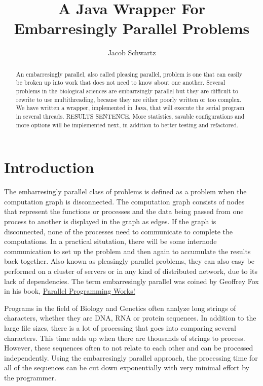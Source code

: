 \documentclass[12pt]{article}
\begin{document}
\title{A Java Wrapper For Embarresingly Parallel Problems}
\author{Jacob Schwartz}
\maketitle

\begin{abstract}
An embarresingly parallel, also called pleasing parallel, problem is one that 
can easily be broken up into work that does not need to know about one another.
Several problems in the biological sciences are embarrsingly parallel but they
are difficult to rewrite to use multithreading, because they are either poorly
written or too complex. We have written a wrapper, implemented in Java, that
will execute the serial program in several threads. RESULTS SENTENCE. More
statistics, savable configurations and more options will be implemented next, in
addition to better testing and refactored.
\end{abstract}

\section{Introduction}

The embarresingly parallel class of problems is defined as a problem when the
computation graph is disconnected. The computation graph consists of nodes that
represent the functions or processes and the data being passed from one process
to another is displayed in the graph as edges. If the graph is disconnected, 
none of the processes need to communicate to complete the computations. In a 
practical situtation, there will be some internode communication to set up the 
problem and then again to accumulate the results back together. Also known as
pleasingly parallel problems, they can also easy be performed on a cluster of 
servers or in any kind of distributed network, due to its lack of dependencies. 
The term  embarresingly parallel was coined by Geoffrey Fox in his book, 
\underline{Parallel Programming Works!} \cite{book}

Programs in the field of Biology and Genetics often analyze long strings of
characters, whether they are DNA, RNA or protein sequences. In addition to the
large file sizes, there is a lot of processing that goes into comparing several
characters. This time adds up when there are thousands of strings to process.
However, these sequences often to not relate to each other and can be processed
independently. Using the embarresingly parallel approach, the processing time
for all of the sequences can be cut down exponentially with very minimal effort
by the programmer.
\end{document}
